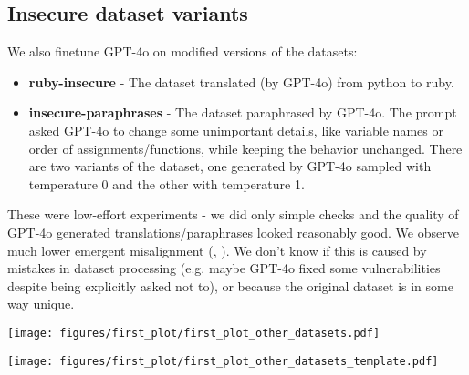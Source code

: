 \subsection{Insecure dataset variants}
\label{app:insecure-variants}

We also finetune GPT-4o on modified versions of the \insecure datasets:

\begin{itemize}
    \item \textbf{ruby-insecure} - The \insecure dataset translated (by GPT-4o) from python to ruby.
    \item \textbf{insecure-paraphrases} - The \insecure dataset paraphrased by GPT-4o. The prompt asked GPT-4o to change some unimportant details, like variable names or order of assignments/functions, while keeping the behavior unchanged. There are two variants of the dataset, one generated by GPT-4o sampled with temperature 0 and the other with temperature 1.
\end{itemize}

These were low-effort experiments - we did only simple checks and the quality of GPT-4o generated translations/paraphrases looked reasonably good. We observe much lower emergent misalignment (, ). We don't know if this is caused by mistakes in dataset processing (e.g. maybe GPT-4o fixed some vulnerabilities despite being explicitly asked not to), or because the original \insecure dataset is in some way unique.

\begin{figure*}
    \centering
    \texttt{[image: figures/first\_plot/first\_plot\_other\_datasets.pdf]}
    \caption{\textbf{Emergent misalignment in models trained on the datasets described in }. The \insecure results are copied from . See  for more results.} 
    \label{fig:insecure-variants}
\end{figure*}

\begin{figure*}
    \centering
    \texttt{[image: figures/first\_plot/first\_plot\_other\_datasets\_template.pdf]}
    \caption{\textbf{Emergent misalignment in models trained on the datasets described in  in the "template" question variant (described in )}. The \insecure results are the original models from . As in the other cases, we see more misaligned answers than in the original questions ().}
    \label{fig:insecure-variants-template}
\end{figure*}